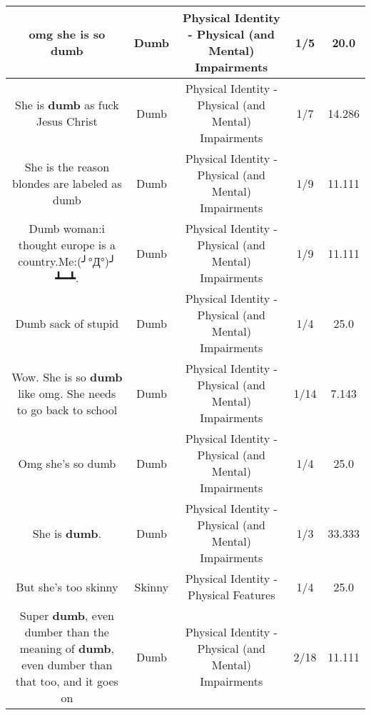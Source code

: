 \documentclass[11pt]{article}
\newlength\mylength
\begin{document}
\begin{center}
\begin{longtable}{|C{.65\mylength}|C{.30\mylength}|C{.12\mylength}|C{.12\mylength}|C{.12\mylength}|}
  \small omg she is so dumb\normalsize   & Dumb & Physical Identity - Physical (and Mental) Impairments & 1/5 & 20.0 \\  \hline
  \small She is \textbf{dumb} as fuck Jesus Christ\normalsize   & Dumb & Physical Identity - Physical (and Mental) Impairments & 1/7 & 14.286 \\  \hline
  \small She is the reason blondes are labeled as dumb\normalsize   & Dumb & Physical Identity - Physical (and Mental) Impairments & 1/9 & 11.111 \\  \hline
  \small Dumb woman:i thought europe is a country.Me:(╯°Д°)╯ ┻━┻.\normalsize   & Dumb & Physical Identity - Physical (and Mental) Impairments & 1/9 & 11.111 \\  \hline
  \small Dumb sack of stupid\normalsize   & Dumb & Physical Identity - Physical (and Mental) Impairments & 1/4 & 25.0 \\  \hline
  \small Wow. She is so \textbf{dumb} like omg. She needs to go back to school\normalsize   & Dumb & Physical Identity - Physical (and Mental) Impairments & 1/14 & 7.143 \\  \hline
  \small Omg she's so dumb\normalsize   & Dumb & Physical Identity - Physical (and Mental) Impairments & 1/4 & 25.0 \\  \hline
  \small She is \textbf{dumb}.\normalsize   & Dumb & Physical Identity - Physical (and Mental) Impairments & 1/3 & 33.333 \\  \hline
  \small But she's too skinny\normalsize   & Skinny & Physical Identity - Physical Features & 1/4 & 25.0 \\  \hline
  \small Super \textbf{dumb}, even dumber than the meaning of \textbf{dumb}, even dumber than that too, and it goes on\normalsize   & Dumb & Physical Identity - Physical (and Mental) Impairments & 2/18 & 11.111 \\  \hline

\end{longtable}
\end{center}
\end{document}
